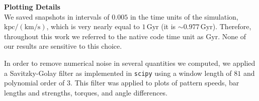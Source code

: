\documentclass{natureprintstyle}
\begin{document}
\vspace{12pt}

\noindent
{\bf Plotting Details}
\\
\noindent
We saved snapshots in intervals of $0.005$ in the time units of the
simulation, $\textrm{kpc}/(\textrm{km}/\textrm{s})$, which is very nearly
equal to $1\,\textrm{Gyr}$ (it is $\sim0.977\,\textrm{Gyr}$). Therefore,
throughout this work we referred to the native code time unit as
$\textrm{Gyr}$. None of our results are sensitive to this choice.

In order to remove numerical noise in several quantities we computed, we
applied a Savitzky-Golay filter\cite{1964AnaCh..36.1627S} as implemented in
\texttt{scipy} using a window length of $81$ and polynomial order of $3$. This
filter was applied to plots of pattern speeds, bar lengths and strengths,
torques, and angle differences.

% 
\end{document}
